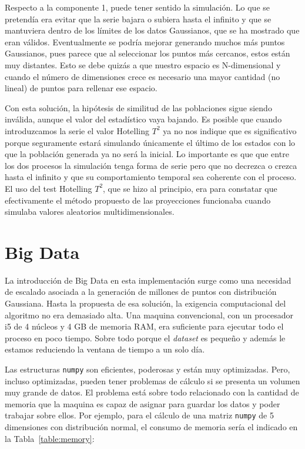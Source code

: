 \documentclass[11pt,spanish,listoffigures,listoftables]{tfgetsinf}
\begin{document}
        Respecto a la componente 1, puede tener sentido la simulación. Lo que se pretendía era evitar que la serie bajara o subiera hasta el infinito y que se mantuviera dentro de los límites de los datos Gaussianos, que se ha mostrado que eran válidos. Eventualmente se podría mejorar generando muchos más puntos Gaussianos, pues parece que al seleccionar los puntos más cercanos, estos están muy distantes. Esto se debe quizás a que nuestro espacio es N-dimensional y cuando el número de dimensiones crece es necesario una mayor cantidad (no lineal) de puntos para rellenar ese espacio.

        Con esta solución, la hipótesis de similitud de las poblaciones sigue siendo inválida, aunque el valor del estadístico vaya bajando. Es posible que cuando introduzcamos la serie el valor Hotelling \(T^2\) ya no nos indique que es significativo porque seguramente estará simulando únicamente el último de los estados con lo que la población generada ya no será la inicial. Lo importante es que que entre los dos procesos la simulación tenga forma de serie pero que no decrezca o crezca hasta el infinito y que su comportamiento temporal sea coherente con el proceso. El uso del test Hotelling \(T^2\), que se hizo al principio, era para constatar que efectivamente el método propuesto de las proyecciones funcionaba cuando simulaba valores aleatorios multidimensionales. 

	
        \section{Big Data}
        La introducción de Big Data en esta implementación surge como una necesidad de escalado asociada a la generación de millones de puntos con distribución Gaussiana. Hasta la propuesta de esa solución, la exigencia computacional del algoritmo no era demasiado alta. Una maquina convencional, con un procesador i5 de 4 núcleos y 4 GB de memoria RAM, era suficiente para ejecutar todo el proceso en poco tiempo. Sobre todo porque el {\em dataset} es pequeño y además le estamos reduciendo la ventana de tiempo a un solo día. 
        
        Las estructuras {\tt numpy} son eficientes, poderosas y están muy optimizadas. Pero, incluso optimizadas, pueden tener problemas de cálculo si se presenta un volumen muy grande de datos. El problema está sobre todo relacionado con la cantidad de memoria que la maquina es capaz de asignar para guardar los datos y poder trabajar sobre ellos. Por ejemplo, para el cálculo de una matriz {\tt numpy} de 5 dimensiones con distribución normal, el consumo de memoria sería el indicado en la Tabla~\ref{table:memory}:
        
\end{document}
